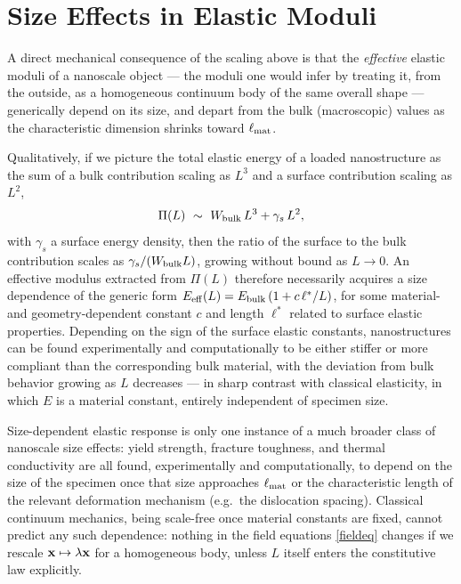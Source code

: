 \section{Size Effects in Elastic Moduli}

A direct mechanical consequence of the scaling above is that the \textit{effective} elastic moduli of a nanoscale object --- the moduli one would infer by treating it, from the outside, as a homogeneous continuum body of the same overall shape --- generically depend on its size, and depart from the bulk (macroscopic) values as the characteristic dimension shrinks toward $\ell_{\rm mat}$.

Qualitatively, if we picture the total elastic energy of a loaded nanostructure as the sum of a bulk contribution scaling as $L^3$ and a surface contribution scaling as $L^2$,
\begin{equation}
	\Pi(L)\ \sim\ W_{\rm bulk}\,L^3 + \gamma_s\, L^2,
\end{equation}
with $\gamma_s$ a surface energy density, then the ratio of the surface to the bulk contribution scales as $\gamma_s/(W_{\rm bulk}L)$, growing without bound as $L\to0$. An effective modulus extracted from $\Pi(L)$ therefore necessarily acquires a size dependence of the generic form $E_{\rm eff}(L) = E_{\rm bulk}\left(1 + c\,\ell^\ast/L\right)$, for some material- and geometry-dependent constant $c$ and length $\ell^\ast$ related to surface elastic properties. Depending on the sign of the surface elastic constants, nanostructures can be found experimentally and computationally to be either stiffer or more compliant than the corresponding bulk material, with the deviation from bulk behavior growing as $L$ decreases --- in sharp contrast with classical elasticity, in which $E$ is a material constant, entirely independent of specimen size.

\begin{remark}
	Size-dependent elastic response is only one instance of a much broader class of nanoscale size effects: yield strength, fracture toughness, and thermal conductivity are all found, experimentally and computationally, to depend on the size of the specimen once that size approaches $\ell_{\rm mat}$ or the characteristic length of the relevant deformation mechanism (e.g.\ the dislocation spacing). Classical continuum mechanics, being scale-free once material constants are fixed, cannot predict any such dependence: nothing in the field equations \eqref{fieldeq} changes if we rescale $\mathbf{x}\mapsto\lambda\mathbf{x}$ for a homogeneous body, unless $L$ itself enters the constitutive law explicitly.
\end{remark}

